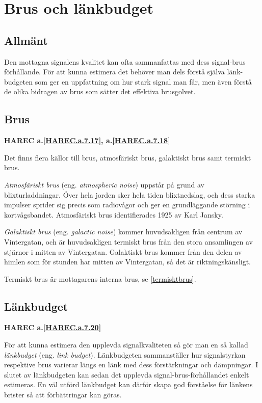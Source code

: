 \section{Brus och länkbudget}

\subsection{Allmänt}

Den mottagna signalens kvalitet kan ofta sammanfattas med dess signal-brus
förhållande.
För att kunna estimera det behöver man dels förstå själva länk-budgeten som
ger en uppfattning om hur stark signal man får, men även förstå de olika
bidragen av brus som sätter det effektiva brusgolvet.

\subsection{Brus}
\textbf{HAREC a.\ref{HAREC.a.7.17}\label{myHAREC.a.7.17}, a.\ref{HAREC.a.7.18}\label{myHAREC.a.7.18}}

Det finns flera källor till brus, atmosfäriskt brus, galaktiskt brus samt
termiskt brus.

\emph{Atmosfäriskt brus} (eng. \emph{atmospheric noise}) uppstår på grund av
blixturladdningar.
Över hela jorden sker hela tiden blixtnedslag, och dess starka impulser sprider
sig precis som radiovågor och ger en grundläggande störning i kortvågsbandet.
Atmosfäriskt brus identifierades 1925 av Karl Jansky.

\emph{Galaktiskt brus} (eng. \emph{galactic noise}) kommer huvudsakligen från
centrum av Vintergatan, och är huvudsakligen termiskt brus från den stora
ansamlingen av stjärnor i mitten av Vintergatan.
Galaktiskt brus kommer från den delen av himlen som för stunden har mitten av
Vintergatan, så det är riktningskänsligt.

Termiskt brus är mottagarens interna brus, se \ref{termisktbrus}.

\subsection{Länkbudget}
\textbf{HAREC a.\ref{HAREC.a.7.20}\label{myHAREC.a.7.20}}

För att kunna estimera den upplevda signalkvaliteten så gör man en så kallad
\emph{länkbudget} (eng. \emph{link budget}).
Länkbudgeten sammanställer hur signalstyrkan respektive brus varierar längs en
länk med dess förstärkningar och dämpningar.
I slutet av länkbudgeten kan sedan det upplevda signal-brus-förhållandet
enkelt estimeras.
En väl utförd länkbudget kan därför skapa god förståelse för länkens brister
så att förbättringar kan göras.

